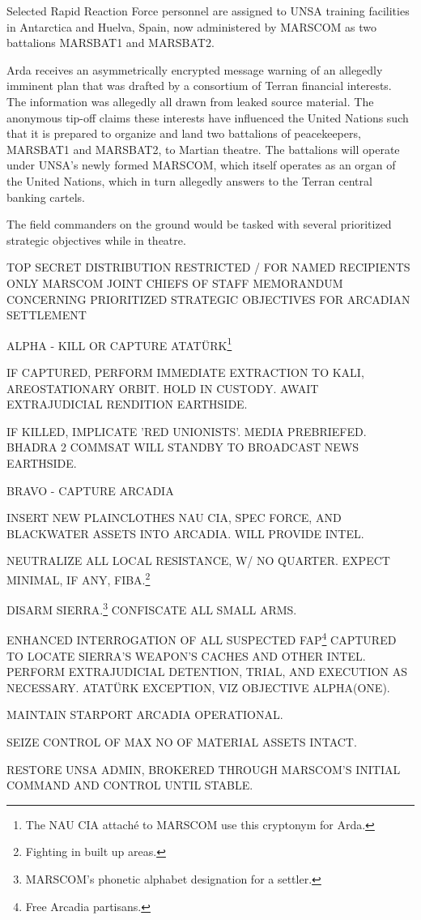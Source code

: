 Selected Rapid Reaction Force personnel are assigned to UNSA training facilities in Antarctica and Huelva, Spain, now administered by MARSCOM as two battalions MARSBAT1 and MARSBAT2.
\StopTimelineDate

Arda receives an asymmetrically encrypted message warning of an allegedly imminent plan that was drafted by a consortium of Terran financial interests. The information was allegedly all drawn from leaked source material. The anonymous tip-off claims these interests have influenced the United Nations such that it is prepared to organize and land two battalions of peacekeepers, MARSBAT1 and MARSBAT2, to Martian theatre. The battalions will operate under UNSA's newly formed MARSCOM, which itself operates as an organ of the United Nations, which in turn allegedly answers to the Terran central banking cartels. 

The field commanders on the ground would be tasked with several prioritized strategic objectives while in theatre. 

\startTimelineCorrespondenceDocument
TOP SECRET
DISTRIBUTION RESTRICTED / FOR NAMED RECIPIENTS ONLY
MARSCOM JOINT CHIEFS OF STAFF
{ MEMORANDUM CONCERNING PRIORITIZED STRATEGIC OBJECTIVES FOR ARCADIAN SETTLEMENT}
\startitemize[4]
\item { ALPHA} - KILL OR CAPTURE ATATÜRK\footnote{The NAU CIA attaché to MARSCOM use this cryptonym for Arda.}

    \startitemize[n]
    \item IF CAPTURED, PERFORM IMMEDIATE EXTRACTION TO KALI, AREOSTATIONARY ORBIT. HOLD IN CUSTODY. AWAIT EXTRAJUDICIAL RENDITION EARTHSIDE.
    \item IF KILLED, IMPLICATE 'RED UNIONISTS'. MEDIA PREBRIEFED. BHADRA 2 COMMSAT WILL STANDBY TO BROADCAST NEWS EARTHSIDE.
    \stopitemize

\item { BRAVO} - CAPTURE ARCADIA
    \startitemize[n]
    \item INSERT NEW PLAINCLOTHES NAU CIA, SPEC FORCE, AND BLACKWATER ASSETS INTO ARCADIA. WILL PROVIDE INTEL.
    \item NEUTRALIZE ALL LOCAL RESISTANCE, W/ NO QUARTER. EXPECT MINIMAL, IF ANY, FIBA.\footnote{Fighting in built up areas.}
    \item DISARM SIERRA.\footnote{MARSCOM's phonetic alphabet designation for a settler.} CONFISCATE ALL SMALL ARMS.
    \item ENHANCED INTERROGATION OF ALL SUSPECTED FAP\footnote{Free Arcadia partisans.} CAPTURED TO LOCATE SIERRA'S WEAPON'S CACHES AND OTHER INTEL. PERFORM EXTRAJUDICIAL DETENTION, TRIAL, AND EXECUTION AS NECESSARY. ATATÜRK EXCEPTION, VIZ OBJECTIVE ALPHA(ONE).
    \item MAINTAIN STARPORT ARCADIA OPERATIONAL.
    \item SEIZE CONTROL OF MAX NO OF MATERIAL ASSETS INTACT.
    \item RESTORE UNSA ADMIN, BROKERED THROUGH MARSCOM'S INITIAL COMMAND AND CONTROL UNTIL STABLE.
    \stopitemize

